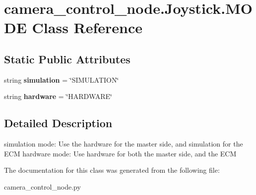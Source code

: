 \hypertarget{classcamera__control__node_1_1Joystick_1_1MODE}{\section{camera\-\_\-control\-\_\-node.\-Joystick.\-M\-O\-D\-E Class Reference}
\label{classcamera__control__node_1_1Joystick_1_1MODE}
}
\subsection*{Static Public Attributes}
\begin{DoxyCompactItemize}
\item 
\hypertarget{classcamera__control__node_1_1Joystick_1_1MODE_a1b1eba0f080686d508c8aa6ff2745d33}{string {\bfseries simulation} = \char`\"{}S\-I\-M\-U\-L\-A\-T\-I\-O\-N\char`\"{}}\label{classcamera__control__node_1_1Joystick_1_1MODE_a1b1eba0f080686d508c8aa6ff2745d33}

\item 
\hypertarget{classcamera__control__node_1_1Joystick_1_1MODE_acf47e7d24e913b73ecf25a5cda3aae9e}{string {\bfseries hardware} = \char`\"{}H\-A\-R\-D\-W\-A\-R\-E\char`\"{}}\label{classcamera__control__node_1_1Joystick_1_1MODE_acf47e7d24e913b73ecf25a5cda3aae9e}

\end{DoxyCompactItemize}


\subsection{Detailed Description}
\begin{DoxyVerb}    simulation mode: Use the hardware for the master side, 
            and simulation for the ECM
    hardware mode: Use hardware for both the master side,
            and the ECM
\end{DoxyVerb}
 

The documentation for this class was generated from the following file\-:\begin{DoxyCompactItemize}
\item 
camera\-\_\-control\-\_\-node.\-py\end{DoxyCompactItemize}

